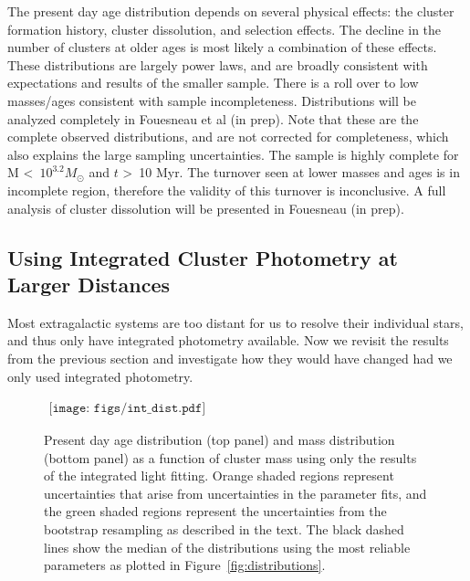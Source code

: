\documentclass{emulateapj}
\begin{document}
The present day age distribution depends on several physical effects:  the cluster formation history, cluster dissolution, and selection effects.  The decline in the number of clusters at older ages is most likely a combination of these effects.  These distributions are largely power laws, and are broadly consistent with expectations and results of the smaller \cite{Fouesneau14} sample.  There is a roll over to low masses/ages consistent with sample incompleteness.  Distributions will be analyzed completely in Fouesneau et al (in prep).  Note that these are the complete observed distributions, and are not corrected for completeness, which also explains the large sampling uncertainties.   The sample is highly complete for M \textless\ $10^{3.2}M_{\odot}$ and $t$ \textgreater\ 10 Myr.  The turnover seen at lower masses and ages is in incomplete region, therefore the validity of this turnover is inconclusive.  A full analysis of cluster dissolution will be presented in Fouesneau (in prep).




\subsection{Using Integrated Cluster Photometry at Larger Distances}\label{sec:intonly}

Most extragalactic systems are too distant for us to resolve their individual stars, and thus only have integrated photometry available.  Now we revisit the results from the previous section and investigate how they would have changed had we only used integrated photometry.




\begin{figure}[ht!]
   \begin{center}$
      \begin{array}{cc}
         \texttt{[image: figs/int\_dist.pdf]} 
      \end{array}$
   \end{center}
  \caption{Present day age distribution (top panel) and mass distribution (bottom panel) as a function of cluster mass using only the results of the integrated light fitting.  Orange shaded regions represent uncertainties that arise from uncertainties in the parameter fits, and the green shaded regions represent the uncertainties from the bootstrap resampling as described in the text.  The black dashed lines show the median of the distributions using the most reliable parameters as plotted in Figure~\ref{fig:distributions}.}
  \label{fig:intdist}
\end{figure}
\end{document}

